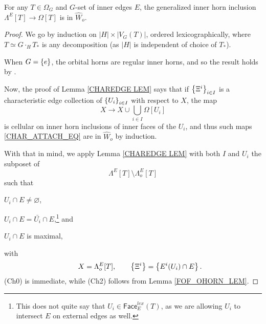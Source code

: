 \documentclass[a4paper,10pt,draft]{article}%
\begin{document}
\begin{proposition}
      \label{HORN_ORB_PROP}
      For any $T \in \Omega_G$ and $G$-set of inner edges $E$,
      the generalized inner horn inclusion
      $\Lambda^{E}[T] \to \Omega[T]$
      is in $\hat{W}_o$.
\end{proposition}
\begin{proof}
      We go by induction on $|H| \times |V_G(T)|$, ordered lexicographically,
      where $T \simeq G \cdot_H T_*$ is any decomposition
      (as $|H|$ is independent of choice of $T_*$).
      
      When $G = \left\{e\right\}$, the orbital horns are regular inner horns, and so the result holds by \cite[Proposition 6.17]{Per17}.

      Now, the proof of Lemma \ref{CHAREDGE LEM} says that
      if $\left\{\Xi^i\right\}_{i \in I}$ is a characteristic edge collection of $\left\{U_i\right\}_{i \in I}$ with respect to $X$,
      the map
      \begin{equation}
            \label{CHAR_ATTACH_EQ}
            X \to X \cup \mathop{\bigcup}\limits_{i \in I} \Omega[U_i]
      \end{equation}
      is cellular on inner horn inclusions of inner faces of the $U_i$,
      and thus such maps \eqref{CHAR_ATTACH_EQ} are in $\hat{W}_o$ by induction.

      With that in mind, we apply Lemma \ref{CHAREDGE LEM} with
      both $I$ and ${U_i}$ the
      subposet of       
      \begin{equation}
            \Lambda^{E}[T] \setminus \Lambda^{E}_o[T]
      \end{equation}
      such that
      \begin{enumerate*}[label=(\roman*\upshape)]
      \item $U_i \cap E \neq \varnothing$,
      \item $U_i \cap E = \bar{U_i} \cap E$,\footnote{
              This does not quite say that $U_i \in \mathsf{Face}^{lex}_{E}(T)$, as
              we are allowing $U_i$ to intersect $E$ on external edges as well.} and
      \item $U_i \cap E$ is maximal,
      \end{enumerate*}
      with
      \begin{equation}
            \qquad X = \Lambda^{E}_o[T],
            \qquad \left\{\Xi^i\right\} = \left\{E^i(U_i) \cap E\right\}.
      \end{equation}
      (Ch0) is immediate,
      while (Ch2) follows from Lemma \ref{FOF_OHORN_LEM}.
      

\end{proof}
\end{document}
